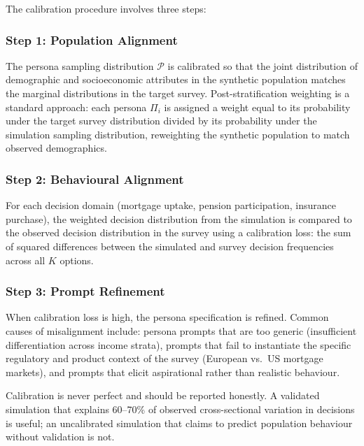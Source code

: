 \begin{context}
The calibration procedure involves three steps:

\subsubsection*{Step 1: Population Alignment}

The persona sampling distribution $\mathcal{P}$ is calibrated so that the joint distribution of demographic and socioeconomic attributes in the synthetic population matches the marginal distributions in the target survey. Post-stratification weighting is a standard approach: each persona $\Pi_i$ is assigned a weight equal to its probability under the target survey distribution divided by its probability under the simulation sampling distribution, reweighting the synthetic population to match observed demographics.

\subsubsection*{Step 2: Behavioural Alignment}

For each decision domain (mortgage uptake, pension participation, insurance purchase), the weighted decision distribution from the simulation is compared to the observed decision distribution in the survey using a calibration loss: the sum of squared differences between the simulated and survey decision frequencies across all $K$ options.

\subsubsection*{Step 3: Prompt Refinement}

When calibration loss is high, the persona specification is refined. Common causes of misalignment include: persona prompts that are too generic (insufficient differentiation across income strata), prompts that fail to instantiate the specific regulatory and product context of the survey (European vs.\ US mortgage markets), and prompts that elicit aspirational rather than realistic behaviour.

Calibration is never perfect and should be reported honestly. A validated simulation that explains 60--70\% of observed cross-sectional variation in decisions is useful; an uncalibrated simulation that claims to predict population behaviour without validation is not.

\end{context}

